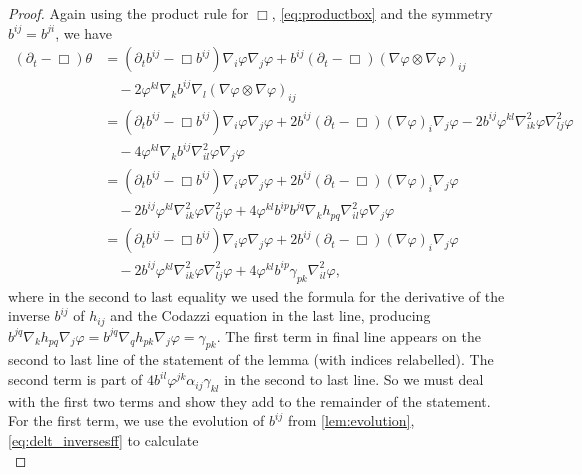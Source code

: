 \documentclass[12pt]{amsart}
\begin{document}
\begin{proof}
Again using the product rule for \(\Box\), \cref{eq:productbox} and the symmetry \(b^{ij} = b^{ji}\), we have
\begin{equation}
\label{eq:delt_theta}
\begin{split}
(\partial_{t} - \Box)\theta &= (\partial_{t}b^{ij} - \Box b^{ij})\nabla_i \varphi\nabla_j\varphi + b^{ij} (\partial_{t} - \Box) (\nabla\varphi \otimes \nabla\varphi)_{ij} \\
&\quad - 2 \varphi^{kl} \nabla_k b^{ij} \nabla_l (\nabla \varphi \otimes \nabla\varphi)_{ij} \\
&= (\partial_{t}b^{ij} - \Box b^{ij})\nabla_i \varphi\nabla_j\varphi + 2 b^{ij} (\partial_{t} - \Box) (\nabla\varphi)_i \nabla_j\varphi - 2 b^{ij} \varphi^{kl} \nabla^2_{ik} \varphi \nabla^2_{lj} \varphi \\
&\quad - 4 \varphi^{kl} \nabla_k b^{ij} \nabla^2_{il} \varphi \nabla_j\varphi \\
&= (\partial_{t}b^{ij} - \Box b^{ij})\nabla_i \varphi\nabla_j\varphi + 2 b^{ij} (\partial_{t} - \Box) (\nabla\varphi)_i \nabla_j\varphi \\
&\quad - 2 b^{ij} \varphi^{kl} \nabla^2_{ik} \varphi \nabla^2_{lj} \varphi + 4 \varphi^{kl} b^{ip}b^{jq} \nabla_k h_{pq} \nabla^2_{il} \varphi \nabla_j\varphi \\
&= (\partial_{t}b^{ij} - \Box b^{ij})\nabla_i \varphi\nabla_j\varphi + 2 b^{ij} (\partial_{t} - \Box) (\nabla\varphi)_i \nabla_j\varphi \\
&\quad - 2 b^{ij} \varphi^{kl} \nabla^2_{ik} \varphi \nabla^2_{lj} \varphi + 4 \varphi^{kl} b^{ip}\gamma_{pk} \nabla^2_{il} \varphi,
\end{split}
\end{equation}
where in the second to last equality we used the formula for the derivative of the inverse \(b^{ij}\) of \(h_{ij}\) and the Codazzi equation in the last line, producing \(b^{jq} \nabla_k h_{pq} \nabla_j \varphi = b^{jq} \nabla_q h_{pk} \nabla_j \varphi = \gamma_{pk}\). The first term in final line appears on the second to last line of the statement of the lemma (with indices relabelled). The second term is part of \(4 b^{il}\varphi^{jk} \alpha_{ij} \gamma_{kl}\) in the second to last line. So we must deal with the first two terms and show they add to the remainder of the statement. For the first term, we use the evolution of \(b^{ij}\) from \cref{lem:evolution}, \cref{eq:delt_inversesff} to calculate
\begin{equation}
\label{eq:delt_theta1}

\end{equation}
\end{proof}
\end{document}
